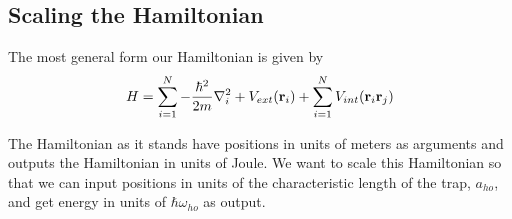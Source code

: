 \documentclass[
    a4paper, aps, twocolumn, floatfix, superscriptaddress,
    nofootinbib]{revtex4-1}
\begin{document}
\begin{appendices}

\section{Scaling the Hamiltonian}

The most general form our Hamiltonian is given by 
\begin{equation}
    H = \sum_{i=1}^{N} -\frac{\hbar^2}{2m}\nabla_i^2 + V_{ext}(\bold{r}_i) + \sum_{i=1}^N V_{int} (\bold{r}_i \bold{r}_j) 
\end{equation}

 The Hamiltonian as it stands have positions in units of meters as arguments and outputs the Hamiltonian in units of Joule. We want to scale this Hamiltonian so that we can input positions in units of the characteristic length of the trap, $a_{ho}$, and get energy in units of $\hbar \omega_{ho}$ as output.
 

\end{appendices}
\end{document}
